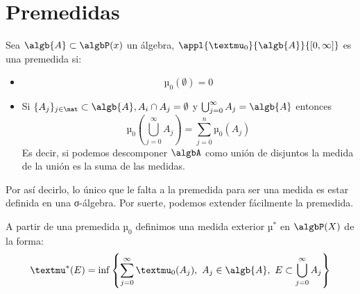 \documentclass{apuntes}
\begin{document}
\section{Premedidas}


\begin{defn}[Premedida]
Sea $\algb{A} \subset \algbP(x)$ un álgebra, $\appl{µ_0}{\algb{A}}{[0, \infty]}$ es una premedida si:
\begin{itemize}
\item
\[µ_0(\emptyset)=0\]
\item Si $\{A_j\}_{j \in \nat} \subset \algb{A}, A_i \cap A_j = \emptyset$ y $\bigcup_{j=0}^{\infty}A_j = \algb{A}$ entonces
\[µ_0(\bigcup_{j=0}^{\infty}A_j) = \sum_{j=0}^{n}µ_0(A_j)\]
Es decir, si podemos descomponer $\algbA$ como unión de disjuntos la medida de la unión es la suma de las medidas.
\end{itemize}
\end{defn}

Por así decirlo, lo único que le falta a la premedida para ser una medida es estar definida en una σ-álgebra. Por suerte, podemos extender fácilmente la premedida.

A partir de una premedida $µ_0$ definimos una medida exterior $µ^*$ en $\algbP(X)$ de la forma:
\[µ^*(E) = \inf \left\{\sum_{j=0}^{\infty} µ_0(A_j), \ A_j \in \algb{A}, \ E \subset \bigcup_{j=0}^{\infty}A_j\right\}\]
\end{document}
